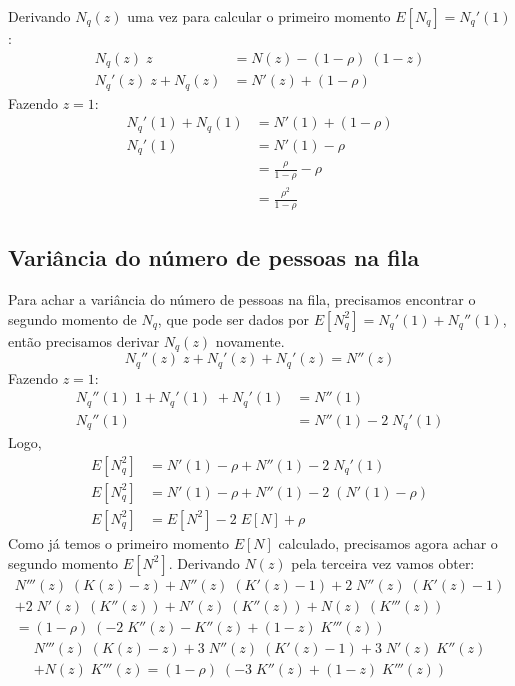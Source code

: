 \documentclass[a4paper]{article}
\newcommand{\E}[1]{E\!\left[#1\right]}
\begin{document}
Derivando \(N_q(z)\) uma vez para calcular o primeiro momento
\(\E{N_q} = N_q'(1)\):
\begin{align*}
    N_q(z) \; z &= N(z) - (1 - \rho) \; (1 - z) \\
    N_q'(z) \; z + N_q(z) &= N'(z) + (1 - \rho)
\end{align*}
Fazendo \(z = 1\):
\begin{align*}
    N_q'(1) + N_q(1) &= N'(1) + (1 - \rho) \\
    N_q'(1) &= N'(1) - \rho \\
    &= \frac{\rho}{1 - \rho} - \rho \\
    &= \frac{\rho^2}{1 - \rho}
\end{align*}

\subsection{Variância do número de pessoas na fila}
Para achar a variância do número de pessoas na fila,
precisamos encontrar o segundo momento de \(N_q\),
que pode ser dados por \(E[N_q^2] = N_q'(1) + N_q''(1)\),
então precisamos derivar \(N_q(z)\) novamente.
\[
    N_q''(z) \; z + N_q'(z) + N_q'(z) = N''(z)
\]
Fazendo \(z = 1\):
\begin{align*}
    N_q''(1) \; 1 + N_q'(1) \; + N_q'(1) &= N''(1) \\
    N_q''(1) &= N''(1) - 2 \; N_q'(1)
\end{align*}
Logo,
\begin{align*}
    \E{N_q^2} &= N'(1) - \rho + N''(1) - 2 \; N_q'(1) \\
    \E{N_q^2} &= N'(1) - \rho + N''(1) - 2 \; (N'(1) - \rho) \\
    \E{N_q^2} &= \E{N^2} - 2 \; \E{N} + \rho
\end{align*}
Como já temos o primeiro momento \(\E{N}\) calculado,
precisamos agora achar o segundo momento \(\E{N^2}\).
Derivando \(N(z)\) pela terceira vez vamos obter:
\begin{align*}
    N'''(z) \; (K(z) - z) + N''(z) \; (K'(z) - 1)
        + 2 \; N''(z) \; (K'(z) - 1) \\
        + 2 \; N'(z) \; (K''(z)) + N'(z) \; (K''(z))
        + N(z) \; (K'''(z)) \\
        = (1 - \rho) \; (-2 \; K''(z) - K''(z)
        + (1 - z) \; K'''(z))
\end{align*} \begin{align*}
    N'''(z) \; (K(z) - z) + 3 \; N''(z) \; (K'(z) - 1)
        + 3 \; N'(z) \; K''(z) \\
        + N(z) \; K'''(z)
        = (1 - \rho) \; (-3 \; K''(z) + (1 - z) \; K'''(z))
\end{align*}
\end{document}
